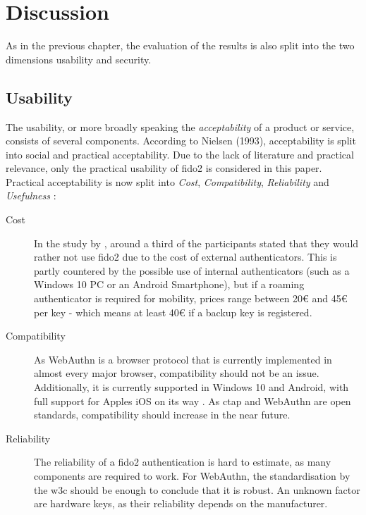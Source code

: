 
\section{Discussion}
\label{sec:discussion}

As in the previous chapter, the evaluation of the results is also split into the two dimensions usability and security.

\subsection{Usability}

The usability, or more broadly speaking the \emph{acceptability} of a product or service, consists of several components. According to Nielsen (1993), acceptability is split into social and practical acceptability. Due to the lack of literature and practical relevance, only the practical usability of \ac{fido2} is considered in this paper.\\
Practical acceptability is now split into \emph{Cost}, \emph{Compatibility}, \emph{Reliability} and \emph{Usefulness} \cite[25 \psq]{nielsen1993}:

\begin{description}
    \item[Cost] In the study by \cite{lyastani2020}, around a third of the participants stated that they would rather not use \ac{fido2} due to the cost of external authenticators. This is partly countered by the possible use of internal authenticators (such as a Windows 10 PC or an Android Smartphone), but if a roaming authenticator is required for mobility, prices range between 20€ and 45€ per key \cite{yubikey_5_nfc} - which means at least 40€ if a backup key is registered.
    \item[Compatibility] As WebAuthn is a browser protocol that is currently implemented in almost every major browser, compatibility should not be an issue. Additionally, it is currently supported in Windows 10 and Android, with full support for Apples iOS on its way \cite{nichols2020}. As \ac{ctap} and WebAuthn are open standards, compatibility should increase in the near future.
    \item[Reliability] The reliability of a \ac{fido2} authentication is hard to estimate, as many components are required to work. For WebAuthn, the standardisation by the \ac{w3c} should be enough to conclude that it is robust. An unknown factor are hardware keys, as their reliability depends on the manufacturer.
\end{description}

